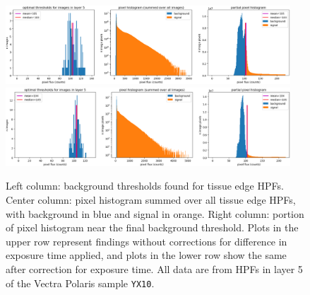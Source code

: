 \documentclass[letterpaper,11pt]{article}
\begin{document}
\begin{figure}[!ht]
\centering
\includegraphics[width=0.95\textwidth]{images/results/thresholding_pre_correction/YX10_layer_5_background_threshold_plots}
\includegraphics[width=0.95\textwidth]{images/results/thresholding_post_correction/YX10_layer_5_background_threshold_plots}
\caption{\footnotesize Left column: background thresholds found for tissue edge HPFs. Center column: pixel histogram summed over all tissue edge HPFs, with background in blue and signal in orange. Right column: portion of pixel histogram near the final background threshold. Plots in the upper row represent findings without corrections for difference in exposure time applied, and plots in the lower row show the same after correction for exposure time. All data are from HPFs in layer 5 of the Vectra Polaris sample \texttt{YX10}.}
\label{fig:background_threshold_impact_polaris_layer_5}
\end{figure}
\end{document}
